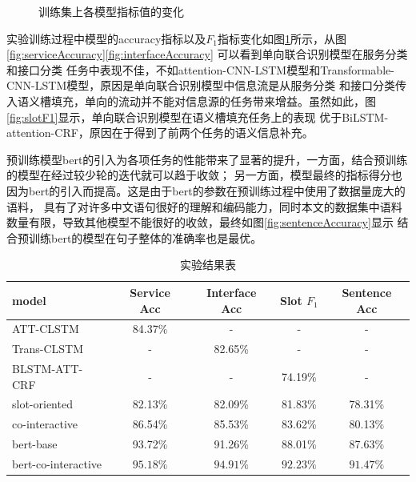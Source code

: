 \begin{figure}[htbp]
  \caption{训练集上各模型指标值的变化}
  \label{fig:4}
  \end{figure}

  实验训练过程中模型的accuracy指标以及$F_1$指标变化如图\ref{fig:4}所示，从图\ref{fig:serviceAccuracy}\ref{fig:interfaceAccuracy}
  可以看到单向联合识别模型在服务分类和接口分类
  任务中表现不佳，不如attention-CNN-LSTM模型和Transformable-CNN-LSTM模型，原因是单向联合识别模型中信息流是从服务分类
  和接口分类传入语义槽填充，单向的流动并不能对信息源的任务带来增益。虽然如此，图\ref{fig:slotF1}显示，单向联合识别模型在语义槽填充任务上的表现
  优于BiLSTM-attention-CRF，原因在于得到了前两个任务的语义信息补充。

  预训练模型bert的引入为各项任务的性能带来了显著的提升，一方面，结合预训练的模型在经过较少轮的迭代就可以趋于收敛；
  另一方面，模型最终的指标得分也因为bert的引入而提高。这是由于bert的参数在预训练过程中使用了数据量庞大的语料，
  具有了对许多中文语句很好的理解和编码能力，同时本文的数据集中语料数量有限，导致其他模型不能很好的收敛，最终如图\ref{fig:sentenceAccuracy}显示
  结合预训练bert的模型在句子整体的准确率也是最优。

  \begin{table}[htb]
    \centering
    \caption{实验结果表}
    \label{tab:jieguo}
\begin{tabular}{l|cccc}
  \toprule
   model&Service Acc&Interface Acc&Slot $F_1$&Sentence Acc\\
   \hline
   ATT-CLSTM&84.37\%&-&-&-\\
   Trans-CLSTM&-&82.65\%&-&-\\
   BLSTM-ATT-CRF&-&-&74.19\%&-\\
   slot-oriented&82.13\%&82.09\%&81.83\%&78.31\%\\
   co-interactive&86.54\%&85.53\%&83.62\%&80.13\%\\
   bert-base&93.72\%&91.26\%&88.01\%&87.63\%\\
   bert-co-interactive&$\mathbf{95.18\%}$&$\mathbf{94.91}\%$&$\mathbf{92.23}\%$&$\mathbf{91.47}\%$\\
  \bottomrule
  \end{tabular}
\end{table}

